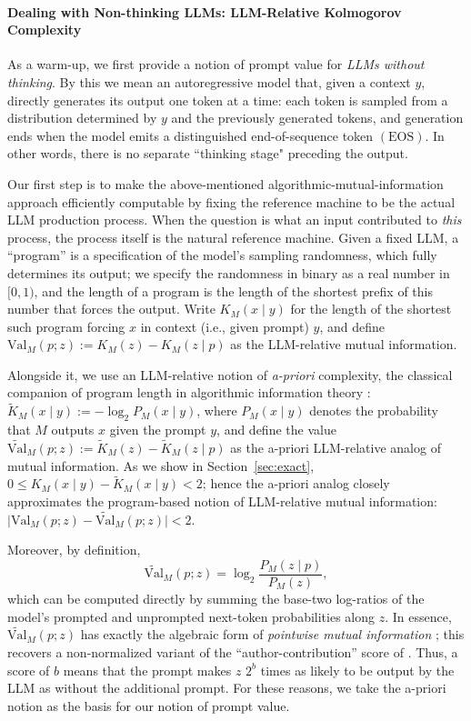 \documentclass[letterpaper]{article} %
\theoremstyle{definition}
\theoremstyle{remark}
\newcommand{\Val}{\mathrm{Val}}
\newcommand{\EOS}{\mathrm{EOS}}
\begin{document}
\paragraph{Dealing with Non-thinking LLMs: LLM-Relative Kolmogorov Complexity}
As a warm-up, we first provide a notion of prompt value for \emph{LLMs without
thinking}.  By this we mean an autoregressive model that, given a context \(y\),
directly generates its output one token at a time: each token is sampled from a
distribution determined by \(y\) and the previously generated tokens, and
generation ends when the model emits a distinguished end-of-sequence token $(\EOS)$. In other words, there is no separate ``thinking stage" preceding the output.

Our first step is to make the above-mentioned algorithmic-mutual-information approach efficiently computable by
fixing the reference machine to be the actual LLM production process. When the
question is what an input contributed to \emph{this} process, the process
itself is the natural reference machine. Given a fixed LLM, a ``program'' is a
specification of the model's sampling randomness, which fully determines its
output; we specify the randomness in binary as a real number in $[0,1)$, and
the length of a program is the length of the shortest prefix of this number
that forces the output. Write $K_M(x\mid y)$ for the length of the shortest
such program forcing $x$ in context (i.e., given prompt) $y$, and define
$\Val_M(p;z) := K_M(z) - K_M(z \mid p)$ as the LLM-relative mutual
information.

Alongside it, we use an LLM-relative notion of \emph{a-priori} complexity, the
classical companion of program length in algorithmic information theory
\cite{ZL70,LiVitanyi}:
$\widetilde K_M(x\mid y):=-\log_2P_M(x\mid y)$,
where $P_M(x\mid y)$ denotes the probability that $M$ outputs $x$ given the
prompt $y$, and define the value
$\widetilde{\Val}_M(p;z):=\widetilde K_M(z)-\widetilde K_M(z\mid p)$ as the a-priori
LLM-relative analog of mutual information. As we show in
Section~\ref{sec:exact},
$0\le K_M(x\mid y)-\widetilde K_M(x\mid y)<2$; hence the a-priori analog closely
approximates the program-based notion of LLM-relative mutual information:
$\bigl| \Val_M(p;z) - \widetilde{\Val}_M(p;z) \bigr| < 2$.

Moreover, by definition,
\[
  \widetilde{\Val}_M(p;z)
  =
  \log_2\frac{P_M(z\mid p)}{P_M(z)},
\]
which can be computed directly by summing the base-two log-ratios of the
model's prompted and unprompted next-token probabilities along \(z\). In essence,
\(\widetilde{\Val}_M(p;z)\) has exactly the algebraic form of
\emph{pointwise mutual information} \cite{Fano61,CH90}; this recovers a
non-normalized variant of the ``author-contribution'' score of
\cite{Xie26}.  Thus, a score of \(b\) means that the prompt makes \(z\)
\(2^b\) times as likely to be output by the LLM as without the additional
prompt.  For these reasons, we take the a-priori notion as the basis for our
notion of prompt value.
\end{document}
